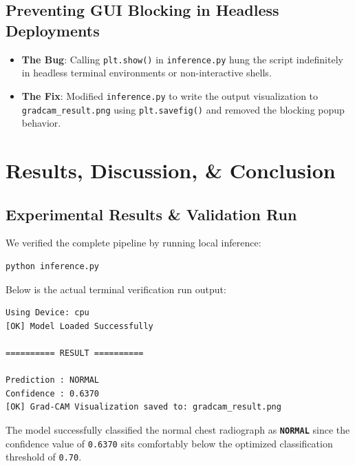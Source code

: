 \documentclass[12pt,oneside]{report}
\begin{document}
\section{Preventing GUI Blocking in Headless Deployments}
\begin{itemize}
    \item \textbf{The Bug}: Calling \texttt{plt.show()} in \texttt{inference.py} hung the script indefinitely in headless terminal environments or non-interactive shells.
    \item \textbf{The Fix}: Modified \texttt{inference.py} to write the output visualization to \texttt{gradcam\_result.png} using \texttt{plt.savefig()} and removed the blocking popup behavior.
\end{itemize}

\chapter{Results, Discussion, \& Conclusion}

\section{Experimental Results \& Validation Run}
We verified the complete pipeline by running local inference:
\begin{lstlisting}[language=bash, label=lst:run, caption=Execution command for local model evaluation]
python inference.py
\end{lstlisting}

\noindent Below is the actual terminal verification run output:
\begin{lstlisting}[label=lst:output, caption=Output logs from local verification showing correct classification]
Using Device: cpu
[OK] Model Loaded Successfully

========== RESULT ==========

Prediction : NORMAL
Confidence : 0.6370
[OK] Grad-CAM Visualization saved to: gradcam_result.png
\end{lstlisting}

\noindent The model successfully classified the normal chest radiograph as \textbf{\texttt{NORMAL}} since the confidence value of \texttt{0.6370} sits comfortably below the optimized classification threshold of \texttt{0.70}.
\end{document}
